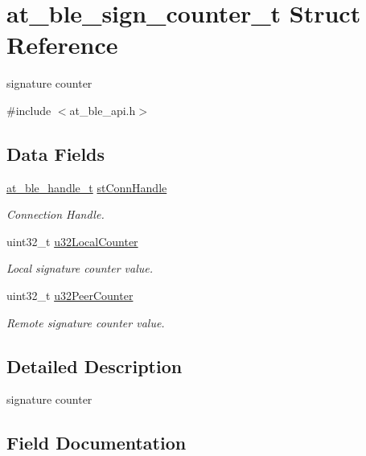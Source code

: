 \hypertarget{structat__ble__sign__counter__t}{}\section{at\+\_\+ble\+\_\+sign\+\_\+counter\+\_\+t Struct Reference}
\label{structat__ble__sign__counter__t}


signature counter  




{\ttfamily \#include $<$at\+\_\+ble\+\_\+api.\+h$>$}

\subsection*{Data Fields}
\begin{DoxyCompactItemize}
\item 
\mbox{\hyperlink{at__ble__api_8h_abd23646d0c662860741f787efc8456f2}{at\+\_\+ble\+\_\+handle\+\_\+t}} \mbox{\hyperlink{structat__ble__sign__counter__t_ada72f3e75af416937f90f82150ef6d70}{st\+Conn\+Handle}}
\begin{DoxyCompactList}\small\item\em Connection Handle. \end{DoxyCompactList}\item 
uint32\+\_\+t \mbox{\hyperlink{structat__ble__sign__counter__t_a5f255db42fac0b9e8e252c34a7dc2406}{u32\+Local\+Counter}}
\begin{DoxyCompactList}\small\item\em Local signature counter value. \end{DoxyCompactList}\item 
uint32\+\_\+t \mbox{\hyperlink{structat__ble__sign__counter__t_a8b42ded8b6c29ef48dc9d09e76d96ce7}{u32\+Peer\+Counter}}
\begin{DoxyCompactList}\small\item\em Remote signature counter value. \end{DoxyCompactList}\end{DoxyCompactItemize}


\subsection{Detailed Description}
signature counter 

\subsection{Field Documentation}
\mbox{\label{structat__ble__sign__counter__t_ada72f3e75af416937f90f82150ef6d70}} 
